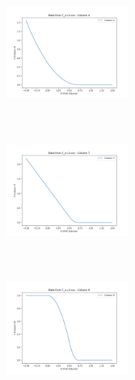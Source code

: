 \documentclass[UTF8]{ctexart}
\begin{document}
\noindent %
\begin{minipage}{0.3\textwidth}
	\includegraphics[width=4cm, height=4cm, keepaspectratio]{../figure/F_n=2.csv_Column_4.png} %
\end{minipage}
\hspace{0.5em} %
\begin{minipage}{0.3\textwidth}
	\includegraphics[width=4cm, height=4cm, keepaspectratio]{../figure/F_n=2.csv_Column_7.png} %
\end{minipage}
\hspace{0.5em} %
\begin{minipage}{0.3\textwidth}
	\includegraphics[width=4cm, height=4cm, keepaspectratio]{../figure/F_n=2.csv_Column_9.png} %
\end{minipage}

\vspace{0.5em} %
\end{document}
